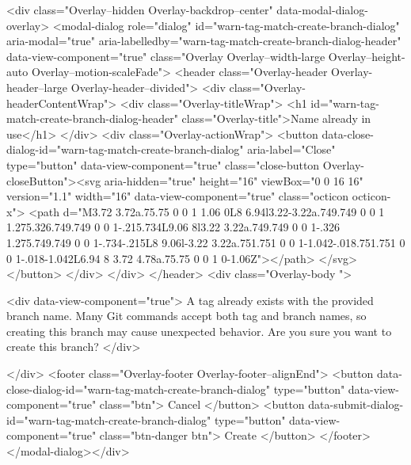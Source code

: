 <div class="Overlay--hidden Overlay-backdrop--center" data-modal-dialog-overlay>
  <modal-dialog role="dialog" id="warn-tag-match-create-branch-dialog" aria-modal="true" aria-labelledby="warn-tag-match-create-branch-dialog-header" data-view-component="true" class="Overlay Overlay--width-large Overlay--height-auto Overlay--motion-scaleFade">
      <header class="Overlay-header Overlay-header--large Overlay-header--divided">
        <div class="Overlay-headerContentWrap">
          <div class="Overlay-titleWrap">
            <h1 id="warn-tag-match-create-branch-dialog-header" class="Overlay-title">Name already in use</h1>
          </div>
          <div class="Overlay-actionWrap">
            <button data-close-dialog-id="warn-tag-match-create-branch-dialog" aria-label="Close" type="button" data-view-component="true" class="close-button Overlay-closeButton"><svg aria-hidden="true" height="16" viewBox="0 0 16 16" version="1.1" width="16" data-view-component="true" class="octicon octicon-x">
    <path d="M3.72 3.72a.75.75 0 0 1 1.06 0L8 6.94l3.22-3.22a.749.749 0 0 1 1.275.326.749.749 0 0 1-.215.734L9.06 8l3.22 3.22a.749.749 0 0 1-.326 1.275.749.749 0 0 1-.734-.215L8 9.06l-3.22 3.22a.751.751 0 0 1-1.042-.018.751.751 0 0 1-.018-1.042L6.94 8 3.72 4.78a.75.75 0 0 1 0-1.06Z"></path>
</svg></button>
          </div>
        </div>
      </header>
    <div class="Overlay-body ">
      
          <div data-view-component="true">      A tag already exists with the provided branch name. Many Git commands accept both tag and branch names, so creating this branch may cause unexpected behavior. Are you sure you want to create this branch?
</div>

    </div>
      <footer class="Overlay-footer Overlay-footer--alignEnd">
            <button data-close-dialog-id="warn-tag-match-create-branch-dialog" type="button" data-view-component="true" class="btn">    Cancel
</button>
            <button data-submit-dialog-id="warn-tag-match-create-branch-dialog" type="button" data-view-component="true" class="btn-danger btn">    Create
</button>
      </footer>
</modal-dialog></div>


